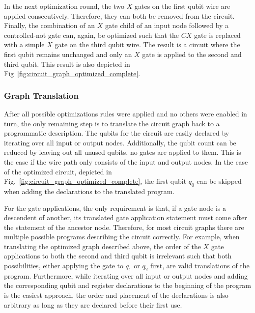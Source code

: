 In the next optimization round, the two $X$ gates on the first qubit wire are applied consecutively. Therefore, they can both be removed from the circuit. Finally, the combination of an $X$ gate child of an input node followed by a controlled-not gate can, again, be optimized such that the $CX$ gate is replaced with a simple $X$ gate on the third qubit wire. The result is a circuit where the first qubit remains unchanged and only an $X$ gate is applied to the second and third qubit. This result is also depicted in Fig~\ref{fig:circuit_graph_optimized_complete}. 



\subsubsection{Graph Translation}
After all possible optimizations rules were applied and no others were enabled in turn, the only remaining step is to translate the circuit graph back to a programmatic description. The qubits for the circuit are easily declared by iterating over all input or output nodes. Additionally, the qubit count can be reduced by leaving out all unused qubits, \ie no gates are applied to them. This is the case if the wire path only consists of the input and output nodes. In the case of the optimized circuit, depicted in Fig.~\ref{fig:circuit_graph_optimized_complete}, the first qubit $q_0$ can be skipped when adding the declarations to the translated program. 

For the gate applications, the only requirement is that, if a gate node is a descendent of another, its translated gate application statement must come after the statement of the ancestor node. Therefore, for most circuit graphs there are multiple possible programs describing the circuit correctly. For example, when translating the optimized graph described above, the order of the $X$ gate applications to both the second and third qubit is irrelevant such that both possibilities, \ie either applying the gate to $q_1$ or $q_2$ first, are valid translations of the program. Furthermore, while iterating over all input or output nodes and adding the corresponding qubit and register declarations to the beginning of the program is the easiest approach, the order and placement of the declarations is also arbitrary as long as they are declared before their first use. 

